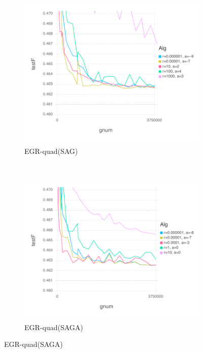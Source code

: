 \documentclass[11pt]{article}
\begin{document}
\begin{figure}[H]
   	    \begin{subfigure}[b]{0.45\textwidth}
              \includegraphics[width=\textwidth]{Figures/SUSYBLtrueffFinal-quadfalse.pdf}
              \caption{EGR-quad(SAG)}
          \end{subfigure}
          ~ %
          \begin{subfigure}[b]{0.45\textwidth}
              \includegraphics[width=\textwidth]{Figures/SUSYBLtrueffFinal-quadtrue.pdf}
              \caption{EGR-quad(SAGA)}
          \end{subfigure}
	   

\end{figure}
\end{document}
